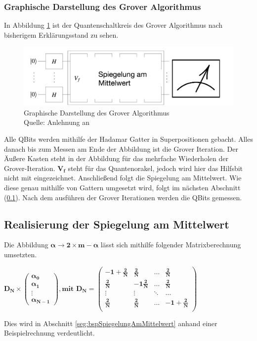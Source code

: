 \subsubsection{Graphische Darstellung des Grover Algorithmus}
In Abbildung \ref{fig:algoInformell} ist der Quantenschaltkreis des Grover Algorithmus nach bisherigem Erklärungsstand zu sehen.
\begin{figure}[hbtp]
	\centering
	\includegraphics[width=1\textwidth]{figures/algoInformell.png}
	\caption{Graphische Darstellung des Grover Algorithmus \\ Quelle: Anlehnung an \cite[S. 146]{Ho17}}
	\label{fig:algoInformell}
\end{figure}
Alle QBits werden mithilfe der Hadamar Gatter in Superpositionen gebacht. Alles danach bis zum Messen am Ende der Abbildung ist die Grover Iteration.
Der Äußere Kasten steht in der Abbildung für das mehrfache Wiederholen der Grover-Iteration. $\mathbf{V_f}$ steht für das Quantenorakel, jedoch wird hier das Hilfsbit nicht mit eingezeichnet. Anschließend folgt die Spiegelung am Mittelwert. Wie diese genau mithilfe von Gattern umgesetzt wird, folgt im nächsten Abschnitt (\ref{sec:realiserung}). Nach dem ausführen der Grover Iterationen werden die QBits gemessen.
\subsection{Realisierung der Spiegelung am Mittelwert}
\label{sec:realiserung}
Die Abbildung $\mathbf{\alpha \rightarrow 2 \times m - \alpha}$ lässt sich mithilfe folgender Matrixberechnung umsetzten.
\begin{center}
	$\mathbf{D_N \times 
	\begin{pmatrix}
			\alpha_0 \\ \alpha_1 \\ \vdots \\  \alpha_{N-1}
	\end{pmatrix}, \text{mit } D_N = 
	\begin{pmatrix}
			-1 + \frac{2}{N} & \frac{2}{N} & \dots& \frac{2}{N} \\
			\frac{2}{N} & -1 \frac{2}{N} & \dots& \frac{2}{N} \\
			\vdots & \vdots & \ddots& \dots \\
			 \frac{2}{N} & \frac{2}{N} & \dots& -1+ \frac{2}{N} \\
	\end{pmatrix}}$
\end{center}
Dies wird in Abschnitt \ref{seg:bspSpiegelungAmMittelwert} anhand einer Beispielrechnung verdeutlicht.
